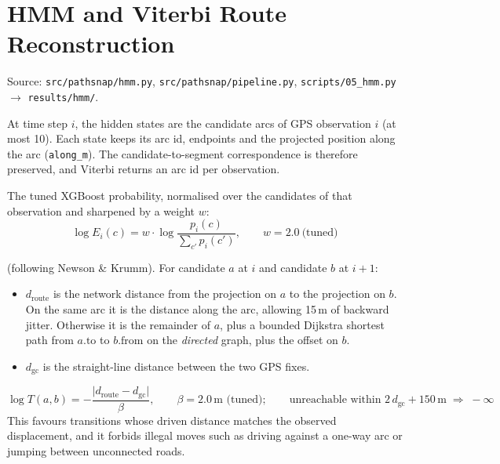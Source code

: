 \documentclass[10pt,a4paper]{article}
\newcommand{\code}[1]{\texttt{\small #1}}
\newcommand{\note}[1]{{\noindent\small\color{black!65}#1\par}}
\newenvironment{qa}{\begin{description}[leftmargin=0pt,labelsep=0.4em,itemsep=2pt,font=\bfseries\color{accent!80!black}]}{\end{description}}
\begin{document}
\section{HMM and Viterbi Route Reconstruction}\label{sec:hmm}
\note{Source: \code{src/pathsnap/hmm.py}, \code{src/pathsnap/pipeline.py}, \code{scripts/05\_hmm.py} $\rightarrow$ \code{results/hmm/}.}
\begin{qa}
\item[1. Hidden states.] At time step $i$, the hidden states are the candidate arcs of GPS observation $i$ (at most 10). Each state keeps its arc id, endpoints and the projected position along the arc (\code{along\_m}). The candidate-to-segment correspondence is therefore preserved, and Viterbi returns an arc id per observation.
\item[2. Emission probabilities.] The tuned XGBoost probability, normalised over the candidates of that observation and sharpened by a weight $w$:
\begin{equation*}
\log E_i(c) = w\cdot\log\frac{p_i(c)}{\sum_{c'}p_i(c')},\qquad w = 2.0\ \text{(tuned)}
\end{equation*}
\item[3. Transition probabilities] (following Newson \& Krumm). For candidate $a$ at $i$ and candidate $b$ at $i+1$:
\begin{itemize}
  \item $d_{\text{route}}$ is the network distance from the projection on $a$ to the projection on $b$. On the same arc it is the distance along the arc, allowing 15\,m of backward jitter. Otherwise it is the remainder of $a$, plus a bounded Dijkstra shortest path from $a.\text{to}$ to $b.\text{from}$ on the \emph{directed} graph, plus the offset on $b$.
  \item $d_{\text{gc}}$ is the straight-line distance between the two GPS fixes.
\end{itemize}
\begin{equation*}
\log T(a,b) = -\frac{\lvert d_{\text{route}}-d_{\text{gc}}\rvert}{\beta},\qquad \beta = 2.0\,\text{m (tuned)};\qquad \text{unreachable within } 2\,d_{\text{gc}}+150\,\text{m} \;\Rightarrow\; -\infty
\end{equation*}
This favours transitions whose driven distance matches the observed displacement, and it forbids illegal moves such as driving against a one-way arc or jumping between unconnected roads.


\end{qa}
\end{document}
